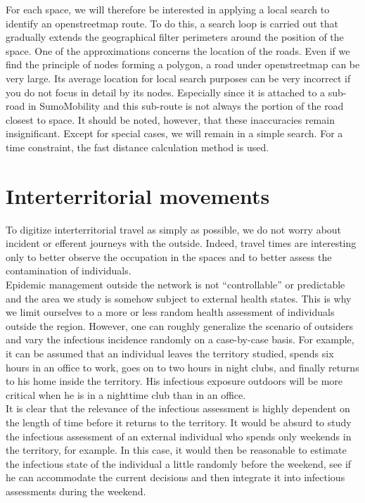 For each space, we will therefore be interested in applying a local search to identify an openstreetmap route. To do this, a search loop is carried out that gradually extends the geographical filter perimeters around the position of the space. One of the approximations concerns the location of the roads. Even if we find the principle of nodes forming a polygon, a road under openstreetmap can be very large. Its average location for local search purposes can be very incorrect if you do not focus in detail by its nodes. Especially since it is attached to a sub-road in SumoMobility and this sub-route is not always the portion of the road closest to space. It should be noted, however, that these inaccuracies remain insignificant. Except for special cases, we will remain in a simple search. For a time constraint, the fast distance calculation method is used.\\

\pagebreak

\section{Interterritorial movements}

To digitize interterritorial travel as simply as possible, we do not worry about incident or efferent journeys with the outside. Indeed, travel times are interesting only to better observe the occupation in the spaces and to better assess the contamination of individuals.\\

Epidemic management outside the network is not ``controllable'' or predictable and the area we study is somehow subject to external health states. This is why we limit ourselves to a more or less random health assessment of individuals outside the region. However, one can roughly generalize the scenario of outsiders and vary the infectious incidence randomly on a case-by-case basis. For example, it can be assumed that an individual leaves the territory studied, spends six hours in an office to work, goes on to two hours in night clubs, and finally returns to his home inside the territory. His infectious exposure outdoors will be more critical when he is in a nighttime club than in an office.\\

It is clear that the relevance of the infectious assessment is highly dependent on the length of time before it returns to the territory. It would be absurd to study the infectious assessment of an external individual who spends only weekends in the territory, for example. In this case, it would then be reasonable to estimate the infectious state of the individual a little randomly before the weekend, see if he can accommodate the current decisions and then integrate it into infectious assessments during the weekend.\\

